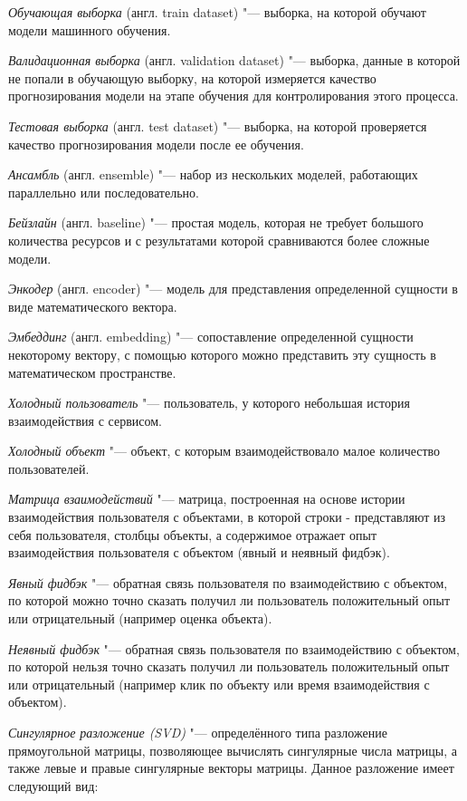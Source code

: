 \documentclass[bachelor, och, coursework]{SCWorks}
\begin{document}
\textit{Обучающая выборка} (англ. train dataset) "--- выборка, на которой обучают модели машинного обучения.

\textit{Валидационная выборка} (англ. validation dataset) "--- выборка, данные в которой не попали в обучающую выборку,
на которой измеряется качество прогнозирования модели на этапе обучения для контролирования этого процесса.

\textit{Тестовая выборка} (англ. test dataset) "--- выборка, на которой проверяется качество прогнозирования модели
после ее обучения.

\textit{Ансамбль}  (англ. ensemble) "--- набор из нескольких моделей, работающих параллельно или последовательно.

\textit{Бейзлайн} (англ. baseline) "--- простая модель, которая не требует большого количества ресурсов и с
результатами которой сравниваются более сложные модели.

\textit{Энкодер} (англ. encoder) "--- модель для представления определенной сущности в виде математического вектора.

\textit{Эмбеддинг} (англ. embedding) "--- сопоставление определенной сущности некоторому вектору, с помощью которого
можно представить эту сущность в математическом пространстве.

\textit{Холодный пользователь} "--- пользователь, у которого небольшая история взаимодействия
с сервисом.

\textit{Холодный объект} "--- объект, с которым взаимодействовало малое количество пользователей.

\textit{Матрица взаимодействий} "--- матрица, построенная на основе истории взаимодействия пользователя с
объектами, в которой строки - представляют из себя пользователя, столбцы объекты, а содержимое отражает
опыт взаимодействия пользователя с объектом (явный и неявный фидбэк).

\textit{Явный фидбэк} "--- обратная связь пользователя по взаимодействию с объектом, по которой можно точно
сказать получил ли пользователь положительный опыт или отрицательный (например оценка объекта).

\textit{Неявный фидбэк} "--- обратная связь пользователя по взаимодействию с объектом, по которой нельзя точно
сказать получил ли пользователь положительный опыт или отрицательный (например клик по объекту или время взаимодействия
с объектом).

\textit{Сингулярное разложение (SVD)} "--- определённого типа разложение прямоугольной матрицы,
позволяющее вычислять сингулярные числа матрицы, а также левые и правые сингулярные векторы матрицы.
Данное разложение имеет следующий вид:
\end{document}
